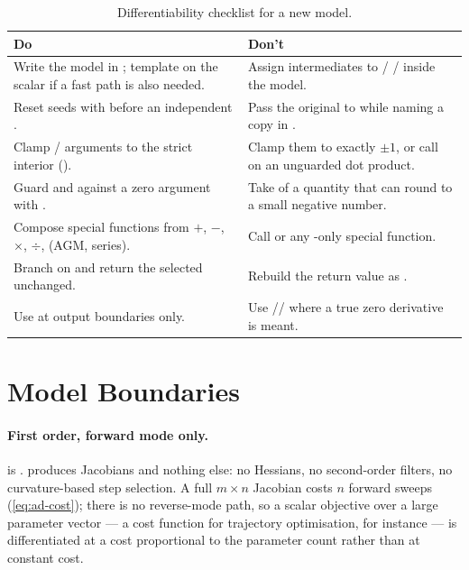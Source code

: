 \begin{table}[H]
  \centering
  \caption{Differentiability checklist for a new model.}
  \label{tab:ad-checklist}
  \begin{tabularx}{\textwidth}{LL}
    \toprule
    Do & Don't \\
    \midrule
    Write the model in ; template on the scalar if a
       fast path is also needed. &
    Assign intermediates to  /  / 
      inside the model. \\
    Reset seeds with  before an independent
      . &
    Pass the original  to  while naming a copy in
      . \\
    Clamp / arguments to the strict interior
      (). &
    Clamp them to exactly $\pm 1$, or call  on an unguarded
      dot product. \\
    Guard  and  against a zero argument with
      . &
    Take  of a quantity that can round to a small negative
      number. \\
    Compose special functions from $+$, $-$, $\times$, $\div$,
       (AGM, series). &
    Call  or any -only special
      function. \\
    Branch on  and return the selected 
      unchanged. &
    Rebuild the return value as . \\
    Use  at output boundaries only. &
    Use // where a true zero derivative
      is meant. \\
    \bottomrule
  \end{tabularx}
\end{table}

\section{Model Boundaries}
\label{sec:ad-boundaries}

\paragraph{First order, forward mode only.}
 is . \lupnt{} produces Jacobians and nothing
else: no Hessians, no second-order filters, no curvature-based step
selection. A full $m\times n$ Jacobian costs $n$ forward sweeps
(\cref{eq:ad-cost}); there is no reverse-mode path, so a scalar objective over
a large parameter vector --- a cost function for trajectory optimisation, for
instance --- is differentiated at a cost proportional to the parameter count
rather than at constant cost.

